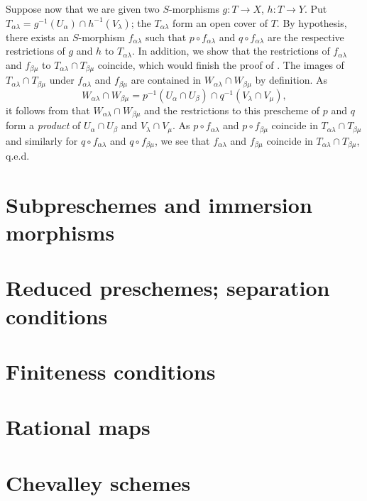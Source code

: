 Suppose now that we are given two $S$-morphisms $g:T\to X$, $h:T\to Y$. Put
$T_{\alpha\lambda}=g^{-1}(U_\alpha)\cap h^{-1}(V_\lambda)$; the $T_{\alpha\lambda}$ form an
open cover of $T$. By hypothesis, there exists an $S$-morphism $f_{\alpha\lambda}$ such that
$p\circ f_{\alpha\lambda}$ and $q\circ f_{\alpha\lambda}$ are the respective restrictions of
$g$ and $h$ to $T_{\alpha\lambda}$. In addition, we show that the restrictions of
$f_{\alpha\lambda}$ and $f_{\beta\mu}$ to $T_{\alpha\lambda}\cap T_{\beta\mu}$ coincide,
which would finish the proof of . The images of
$T_{\alpha\lambda}\cap T_{\beta\mu}$ under $f_{\alpha\lambda}$ and $f_{\beta\mu}$ are
contained in $W_{\alpha\lambda}\cap W_{\beta\mu}$ by definition. As
\[
  W_{\alpha\lambda}\cap W_{\beta\mu}
  =p^{-1}(U_\alpha\cap U_\beta)\cap q^{-1}(V_\lambda\cap V_\mu),
\]
it follows from  that $W_{\alpha\lambda}\cap W_{\beta\mu}$ and the
restrictions to this prescheme of $p$ and $q$ form a \emph{product} of $U_\alpha\cap U_\beta$
and $V_\lambda\cap V_\mu$. As $p\circ f_{\alpha\lambda}$ and $p\circ f_{\beta\mu}$ coincide
in $T_{\alpha\lambda}\cap T_{\beta\mu}$ and similarly for $q\circ f_{\alpha\lambda}$ and
$q\circ f_{\beta\mu}$, we see that $f_{\alpha\lambda}$ and $f_{\beta\mu}$ coincide in
$T_{\alpha\lambda}\cap T_{\beta\mu}$, q.e.d.




\section{Subpreschemes and immersion morphisms}
\label{1-schemes-4}

\section{Reduced preschemes; separation conditions}
\label{1-schemes-5}

\section{Finiteness conditions}
\label{1-schemes-6}

\section{Rational maps}
\label{1-schemes-7}

\section{Chevalley schemes}
\label{1-schemes-8}

